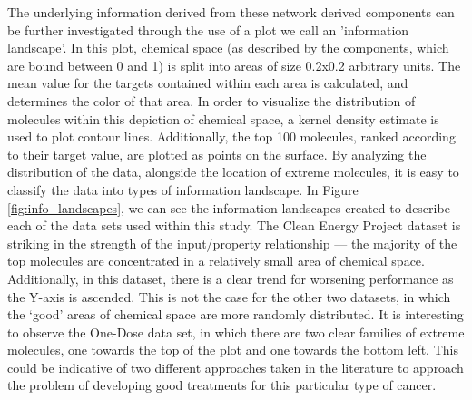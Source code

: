 The underlying information derived from these network derived components can be further investigated through the use of a plot we call an 'information landscape'.  In this plot, chemical space (as described by the components, which are bound between 0 and 1) is split into areas of size 0.2x0.2 arbitrary units. The mean value for the targets contained within each area is calculated, and determines the color of that area.  In order to visualize the distribution of molecules within this depiction of chemical space, a kernel density estimate is used to plot contour lines.  Additionally, the top 100 molecules, ranked according to their target value, are plotted as points on the surface.  By analyzing the distribution of the data, alongside the location of extreme molecules, it is easy to classify the data into types of information landscape.  In Figure \ref{fig:info_landscapes}, we can see the information landscapes created to describe each of the data sets used within this study.  The Clean Energy Project dataset is striking in the strength of the input/property relationship --- the majority of the top molecules are concentrated in a relatively small area of chemical space.  Additionally, in this dataset, there is a clear trend for worsening performance as the Y-axis is ascended.  This is not the case for the other two datasets, in which the `good' areas of chemical space are more randomly distributed.  It is interesting to observe the One-Dose data set, in which there are two clear families of extreme molecules, one towards the top of the plot and one towards the bottom left.  This could be indicative of two different approaches taken in the literature to approach the problem of developing good treatments for this particular type of cancer. 
